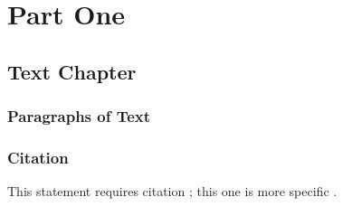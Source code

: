 \documentclass[11pt,fleqn]{book} %
\begin{document}


\pagestyle{empty} %

\tableofcontents %

\cleardoublepage %

\pagestyle{fancy} %


\part{Part One}



\chapter{Text Chapter}

\section{Paragraphs of Text}

\lipsum[1-7] %


\section{Citation}

This statement requires citation \cite{article_key}; this one is more specific \cite[162]{book_key}.

\end{document}
